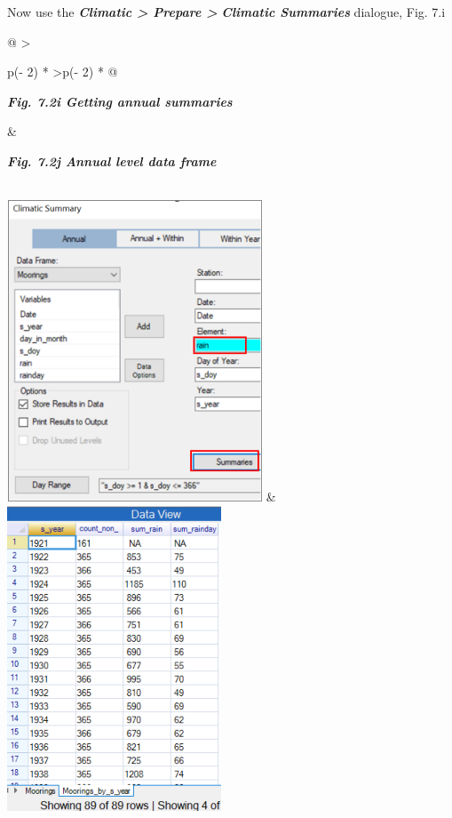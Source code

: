\documentclass[
  letterpaper,
  DIV=11,
  numbers=noendperiod]{scrreprt}
\begin{document}
Now use the \textbf{\emph{Climatic \textgreater{} Prepare
\textgreater{}}} \textbf{\emph{Climatic Summaries}} dialogue, Fig. 7.i

\begin{longtable}[]{@{}
  >{\raggedright\arraybackslash}p{(\columnwidth - 2\tabcolsep) * }
  >{\raggedleft\arraybackslash}p{(\columnwidth - 2\tabcolsep) * }@{}}
\toprule\noalign{}
\begin{minipage}[b]{\linewidth}\raggedright
\textbf{\emph{Fig. 7.2i Getting annual summaries}}
\end{minipage} & \begin{minipage}[b]{\linewidth}\raggedleft
\textbf{\emph{Fig. 7.2j Annual level data frame}}
\end{minipage} \\
\midrule\noalign{}
\endhead
\bottomrule\noalign{}
\endlastfoot
\includegraphics[width=2.99177in,height=3.53007in]{figures/Fig7.2i.png}
&
\includegraphics[width=2.51092in,height=3.57793in]{figures/Fig7.2j.png} \\
\end{longtable}
\end{document}
